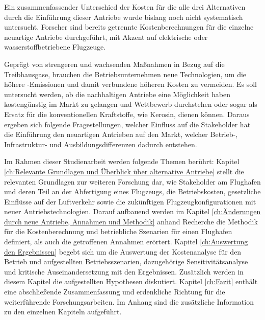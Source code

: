 
Ein zusammenfassender Unterschied der Kosten für die alle drei Alternativen durch die Einführung dieser Antriebe 
wurde bislang noch nicht systematisch
untersucht. Forscher sind bereits getrennte Kostenberechnungen für die einzelne neuartige Antriebe durchgeführt, mit Akzent auf
elektrische oder wasserstoffbetriebene Flugzeuge. 

Geprägt von strengeren und wachsenden Maßnahmen in Bezug auf die Treibhausgase, brauchen die Betriebsunternehmen neue Technologien, um die  
höhere -Emissionen und damit verbundene höheren Kosten zu vermeiden.
Es soll untersucht werden, ob die nachhaltigen Antriebe eine Möglichkeit haben kostengünstig im Markt zu gelangen und Wettbewerb durchstehen oder 
sogar als Ersatz für die konventionellen Kraftstoffe, wie Kerosin, dienen können. 
Daraus ergeben sich folgende Fragestellungen, welcher Einfluss auf die Stakeholder hat die Einführung den neuartigen Antrieben auf den Markt, welcher Betrieb-, Infrastruktur- und Ausbildungsdifferenzen dadurch entstehen.

Im Rahmen dieser Studienarbeit werden folgende Themen berührt:
Kapitel \ref{ch:Relevante Grundlagen und Überblick über alternative Antriebe} stellt die relevanten Grundlagen zur weiteren Forschung dar, wie Stakeholder am Flughafen und deren Teil an der Abfertigung eines Flugzeugs,
die Betriebskosten, gesetzliche Einflüsse auf der Luftverkehr sowie die zukünftigen Flugzeugkonfigurationen mit neuer Antriebstechnologien.
Darauf aufbauend werden im Kapitel \ref{ch:Änderungen durch neue Antriebe, Annahmen und Methodik} anhand Recherche die Methodik für die Kostenberechnung und betriebliche Szenarien für einen Flughafen definiert, 
als auch die getroffenen Annahmen erörtert.
Kapitel \ref{ch:Auswertung den Ergebnissen} begebt sich um die Auswertung der Kostenanalyse für den Betrieb und aufgestellten Betriebsszenarien, dazugehörige Sensitivitätsanalyse und
kritische Auseinandersetzung mit den Ergebnissen. Zusätzlich werden in diesem Kapitel die aufgestellten Hypothesen diskutiert.
%
Kapitel \ref{ch:Fazit} enthält eine abschließende Zusammenfassung und erdenkliche Richtung für die weiterführende Forschungsarbeiten.
Im Anhang sind die zusätzliche Information zu den einzelnen Kapiteln aufgeführt.
